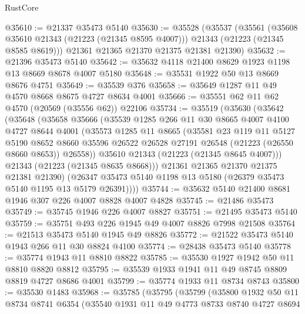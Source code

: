 \begin{lexlean}{RustCore}
\begin{coremodule}
@35610 := @21337 @35473 @5140
@35630 := @35528
    (@35537
      (@35561
        (@35608 @35610 @21343 (@21223 (@21345 @8595 @4007)))
        @21343
        (@21223 (@21345 @8585 @8619)))
      @21361
      @21365
      @21370
      @21375
      @21381
      @21390)
@35632 := @21396 @35473 @5140
@35642 := @35632 @4118 @21400 @8629 @1923 @1198 @13 @8669 @8678 @4007 @5180
@35648 := @35531 @1922 @50 @13 @8669 @8676 @4751
@35649 := @35539 @376
@35658 := @35649 @1287 @11 @49 @4570 @8668 @8675 @4727 @8634 @4001
@35666 := @35551 @62 @11 @62 @4570 (@20569 (@35556 @62)) @22106
@35734 := @35519
    (@35630
      (@35642
        (@35648
          (@35658
            @35666
            (@35539
              @1285
              @266
              @11
              @30
              @8665
              @4007
              @4100
              @4727
              @8644
              @4001
              (@35573
                @1285
                @11
                @8665
                (@35581
                  @23
                  @119
                  @11
                  @5127
                  @5190
                  @8652
                  @8660
                  @35596
                  @26522
                  @26528
                  @27191
                  @26548
                  (@21223 (@26550 @8660 @8653))
                  @26558))
              @35610
              @21343
              (@21223 (@21345 @8645 @4007)))
            @21343
            (@21223 (@21345 @8635 @8668)))
          @21361
          @21365
          @21370
          @21375
          @21381
          @21390)
        (@26347 @35473 @5140 @1198 @13 @5180 (@26379 @35473 @5140 @1195 @13 @5179 @26391))))
@35744 := @35632 @5140 @21400 @8681 @1946 @307 @226 @4007 @8828 @4007 @4828
@35745 := @21486 @35473
@35749 := @35745 @1946 @226 @4007 @8827
@35751 := @21495 @35473 @5140
@35759 := @35751 @493 @226 @1945 @49 @4007 @8826 @7998 @21508
@35764 := @21513 @35473 @5140 @1945 @49 @8826
@35772 := @21522 @35473 @5140 @1943 @266 @11 @30 @8824 @4100
@35774 := @28438 @35473 @5140
@35778 := @35774 @1943 @11 @8810 @8822
@35785 := @35530 @1927 @1942 @50 @11 @8810 @8820 @8812
@35795 := @35539 @1933 @1941 @11 @49 @8745 @8809 @8819 @4727 @8686 @4001
@35799 := @35774 @1933 @11 @8734 @8743
@35800 := @35530 @1483
@35968 := @35785
    (@35795
      (@35799
        (@35800
          @1932
          @50
          @11
          @8734
          @8741
          @6354
          (@35540
            @1931
            @11
            @49
            @4773
            @8733
            @8740
            @4727
            @8694

\end{coremodule}
\end{lexlean}
